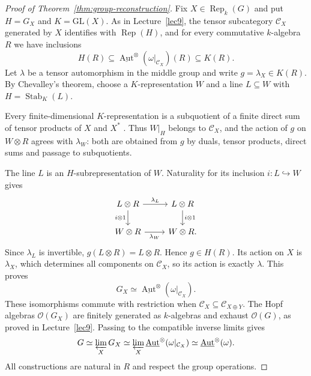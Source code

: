 \begin{proof}[Proof of Theorem~\ref{thm:group-reconstruction}]
Fix $X\in\operatorname{Rep}_k(G)$ and put $H=G_X$ and
$K=\mathrm{GL}(X)$. As in Lecture~\ref{lec9}, the tensor subcategory
$\mathcal C_X$ generated by $X$ identifies with $\operatorname{Rep}(H)$,
and for every commutative $k$-algebra $R$ we have inclusions
\[
 H(R)\subseteq
 \underline{\operatorname{Aut}}^{\otimes}(\omega|_{\mathcal C_X})(R)
 \subseteq K(R).
\]
Let $\lambda$ be a tensor automorphism in the middle group and write
$g=\lambda_X\in K(R)$. By Chevalley's theorem, choose a
$K$-representation $W$ and a line $L\subseteq W$ with
$H=\operatorname{Stab}_K(L)$.

Every finite-dimensional $K$-representation is a subquotient of a finite
direct sum of tensor products of $X$ and $X^*$
\cite[Chapter VIII, Theorem 11.7]{milneAGS}. Thus $W|_H$ belongs to
$\mathcal C_X$, and the action of $g$ on $W\otimes R$ agrees with
$\lambda_W$: both are obtained from $g$ by duals, tensor products,
direct sums and passage to subquotients.

The line $L$ is an $H$-subrepresentation of $W$. Naturality for its
inclusion $i:L\hookrightarrow W$ gives
\[
 \begin{tikzcd}
 L\otimes R \arrow[r,"\lambda_L"] \arrow[d,"i\otimes1"'] &
 L\otimes R \arrow[d,"i\otimes1"]\\
 W\otimes R \arrow[r,"\lambda_W"'] & W\otimes R.
 \end{tikzcd}
\]
Since $\lambda_L$ is invertible, $g(L\otimes R)=L\otimes R$.
Hence $g\in H(R)$. Its action on $X$ is $\lambda_X$, which determines
all components on $\mathcal C_X$, so its action is exactly $\lambda$.
This proves
\[
 G_X\simeq\underline{\operatorname{Aut}}^{\otimes}
 (\omega|_{\mathcal C_X}).
\]
These isomorphisms commute with restriction when
$\mathcal C_X\subseteq\mathcal C_{X\oplus Y}$. The Hopf algebras
$\mathcal O(G_X)$ are finitely generated as $k$-algebras and exhaust
$\mathcal O(G)$, as proved in Lecture~\ref{lec9}. Passing to the
compatible inverse limits gives
\[
 G\simeq\varprojlim_X G_X
 \simeq\varprojlim_X
 \underline{\operatorname{Aut}}^{\otimes}(\omega|_{\mathcal C_X})
 \simeq\underline{\operatorname{Aut}}^{\otimes}(\omega).
\]
All constructions are natural in $R$ and respect the group operations.
\end{proof}

